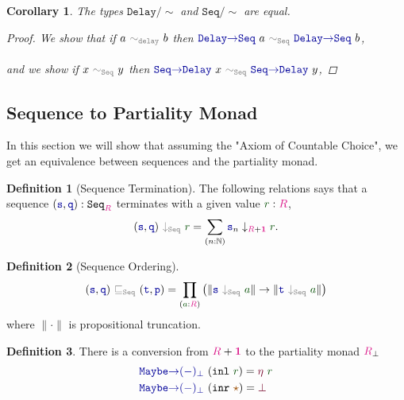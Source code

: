 \documentclass[twoside,11pt,openright]{report}
\theoremstyle{plain} %
\newtheorem*{cor}{Corollary}
\theoremstyle{definition}
\newtheorem{defn}{Definition}[section]
\theoremstyle{remark}
\newcommand*{\term}[1]{\textcolor{green!30!black}{#1}} %
\newcommand*{\type}[1]{\textcolor{magenta!90!black}{#1}}
\newcommand*{\unit}{\type{\textbf{1}}}
\newcommand*{\relation}[1]{\textcolor{gray}{\ensuremath{\mathtt{#1}}}}
\newcommand*{\constant}[1]{\textcolor{orange!60!black}{\ensuremath{\mathtt{#1}}}}
\newcommand*{\function}[1]{\textcolor{blue!60!black}{\ensuremath{\mathtt{#1}}}}
\newcommand*{\constructor}[1]{\textcolor{purple!60!black}{\ensuremath{\mathtt{#1}}}}
\newcommand*{\typeformer}[1]{\ensuremath{\mathtt{#1}}}
\newcommand*{\unitelem}{\constant{\star}} %
\begin{document}
\begin{cor}
  The types \(\typeformer{Delay}/\sim\) and \(\typeformer{Seq}/\sim\) are equal.
  \begin{proof}
    We show that if \(a~\relation{\sim_{delay}}~b\) then \(\function{Delay{\rightarrow}Seq}~a~\relation{\sim_{Seq}}~\function{Delay{\rightarrow}Seq}~b\), 
    \\ \\
    and we show if \(x~\relation{\sim_{Seq}}~y\) then \(\function{Seq{\rightarrow}Delay}~x~\relation{\sim_{Seq}}~\function{Seq{\rightarrow}Delay}~y\), 
  \end{proof}
\end{cor}

\subsection{Sequence to Partiality Monad}
In this section we will show that assuming the "Axiom of Countable Choice", we get an equivalence between sequences and the partiality monad.
\begin{defn}[Sequence Termination]
  The following relations says that a sequence \((\function{s},\function{q}) : \typeformer{Seq}_{\type{R}}\) terminates with a given value \(\term{r} : \type{R}\),
  \begin{equation}
    (\function{s},\function{q})~\relation{\downarrow_{\mathtt{Seq}}}~\term{r} = \sum_{(n : \mathbb{N})} \function{s}_n \downarrow_{\type{R} + \unit} \term{r}.
  \end{equation}
\end{defn}
\begin{defn}[Sequence Ordering]
  \begin{equation}
    (\function{s},\function{q})~\relation{\sqsubseteq_{\mathtt{Seq}}}~(\function{t},\function{p}) = \prod_{(\term{a} : \type{R})} \left(\|\function{s}~\relation{\downarrow_{\mathtt{Seq}}}~\term{a}\| \rightarrow \| \function{t}~\relation{\downarrow_{\mathtt{Seq}}}~\term{a}\|\right)
  \end{equation}
  where \(\| \cdot \|\) is propositional truncation.
\end{defn}
\begin{defn} There is a conversion from \(\type{R} + \unit\) to the partiality monad \(\type{R}_\bot\)
  \begin{equation}
    \begin{aligned}
      &\function{Maybe{\rightarrow}(-)_\bot}~(\mathtt{inl}~\term{r}) = \constructor{\eta}~\term{r} \\
      &\function{Maybe{\rightarrow}(-)_\bot}~(\mathtt{inr}~\unitelem) = \constructor{\bot}
    \end{aligned}
  \end{equation}
\end{defn}
\end{document}
